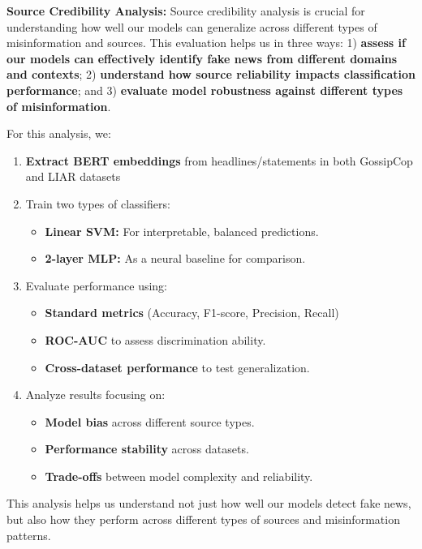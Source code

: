 \documentclass[11pt,a4paper]{article}
\begin{document}
\textbf{Source Credibility Analysis:}
Source credibility analysis is crucial for understanding how well our models can generalize across different types of misinformation and sources. This evaluation helps us in three ways: 1) \textbf{assess if our models can effectively identify fake news from different domains and contexts}; 2) \textbf{understand how source reliability impacts classification performance}; and 3) \textbf{evaluate model robustness against different types of misinformation}.

For this analysis, we:
\begin{enumerate}
    \item \textbf{Extract BERT embeddings} from headlines/statements in both GossipCop and LIAR datasets
    \item Train two types of classifiers:
        \begin{itemize}
            \item \textbf{Linear SVM:} For interpretable, balanced predictions.
            \item \textbf{2-layer MLP:} As a neural baseline for comparison.
        \end{itemize}
    \item Evaluate performance using:
        \begin{itemize}
            \item \textbf{Standard metrics} (Accuracy, F1-score, Precision, Recall)
            \item \textbf{ROC-AUC} to assess discrimination ability.
            \item \textbf{Cross-dataset performance} to test generalization.
        \end{itemize}
    \item Analyze results focusing on:
        \begin{itemize}
            \item \textbf{Model bias} across different source types.
            \item \textbf{Performance stability} across datasets.
            \item \textbf{Trade-offs} between model complexity and reliability.
        \end{itemize}
\end{enumerate}

This analysis helps us understand not just how well our models detect fake news, but also how they perform across different types of sources and misinformation patterns.
\end{document}

